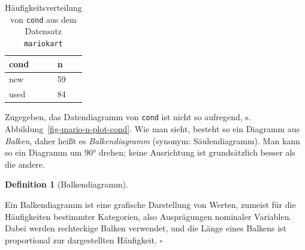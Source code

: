 \documentclass[
  letterpaper,
  twoside,
  open=any]{scrbook}
\theoremstyle{definition}
\theoremstyle{definition}
\theoremstyle{definition}
\newtheorem{definition}{Definition}[chapter]
\theoremstyle{remark}
\begin{document}
\begin{longtable}[]{@{}ll@{}}

\caption{\label{tbl-wheels-n}Häufigkeitsverteilung von \texttt{cond} aus
dem Datensatz \texttt{mariokart}}

\tabularnewline

\toprule\noalign{}
cond & n \\
\midrule\noalign{}
\endhead
\bottomrule\noalign{}
\endlastfoot
new & 59 \\
used & 84 \\

\end{longtable}

Zugegeben, das Datendiagramm von \texttt{cond} ist nicht so aufregend,
s. Abbildung~\ref{fig-mario-n-plot-cond}. Wie man sieht, besteht so ein
Diagramm aus \emph{Balken}, daher heißt es \emph{Balkendiagramm}
(synonym: Säulendiagramm). Man kann so ein Diagramm um 90° drehen; keine
Ausrichtung ist grundsätzlich besser als die andere.

\begin{definition}[Balkendiagramm]\protect\hypertarget{def-balken}{}\label{def-balken}

Ein Balkendiagramm ist eine grafische Darstellung von Werten, zumeist
für die Häufigkeiten bestimmter Kategorien, also Ausprägungen nominaler
Variablen. Dabei werden rechteckige Balken verwendet, und die Länge
eines Balkens ist proportional zur dargestellten Häufigkeit. \(\square\)

\end{definition}
\end{document}

